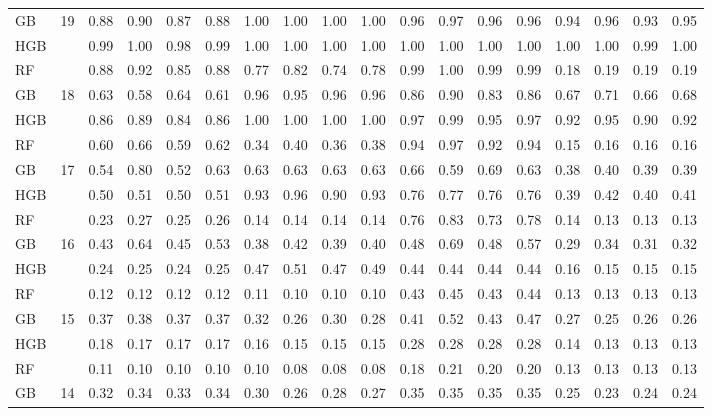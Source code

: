 \documentclass{IEEEtran}
\begin{document}
\begin{table}[th]
\begin{adjustbox}{width=\textwidth}
\begin{tabular}{| l | l | rrrr | rrrr | rrrr | rrrr |}
GB & \multirow{3}{*}{19} & 0.88 & 0.90 & 0.87 & 0.88 & 1.00 & 1.00 & 1.00 & 1.00 & 0.96 & 0.97 & 0.96 & 0.96 & 0.94 & 0.96 & 0.93 & 0.95 \\
HGB &   & 0.99 & 1.00 & 0.98 & 0.99 & 1.00 & 1.00 & 1.00 & 1.00 & 1.00 & 1.00 & 1.00 & 1.00 & 1.00 & 1.00 & 0.99 & 1.00 \\
RF &   & 0.88 & 0.92 & 0.85 & 0.88 & 0.77 & 0.82 & 0.74 & 0.78 & 0.99 & 1.00 & 0.99 & 0.99 & 0.18 & 0.19 & 0.19 & 0.19 \\ \hline
GB & \multirow{3}{*}{18} & 0.63 & 0.58 & 0.64 & 0.61 & 0.96 & 0.95 & 0.96 & 0.96 & 0.86 & 0.90 & 0.83 & 0.86 & 0.67 & 0.71 & 0.66 & 0.68 \\
HGB &   & 0.86 & 0.89 & 0.84 & 0.86 & 1.00 & 1.00 & 1.00 & 1.00 & 0.97 & 0.99 & 0.95 & 0.97 & 0.92 & 0.95 & 0.90 & 0.92 \\
RF &   & 0.60 & 0.66 & 0.59 & 0.62 & 0.34 & 0.40 & 0.36 & 0.38 & 0.94 & 0.97 & 0.92 & 0.94 & 0.15 & 0.16 & 0.16 & 0.16 \\ \hline
GB & \multirow{3}{*}{17} & 0.54 & 0.80 & 0.52 & 0.63 & 0.63 & 0.63 & 0.63 & 0.63 & 0.66 & 0.59 & 0.69 & 0.63 & 0.38 & 0.40 & 0.39 & 0.39 \\
HGB &   & 0.50 & 0.51 & 0.50 & 0.51 & 0.93 & 0.96 & 0.90 & 0.93 & 0.76 & 0.77 & 0.76 & 0.76 & 0.39 & 0.42 & 0.40 & 0.41 \\
RF &   & 0.23 & 0.27 & 0.25 & 0.26 & 0.14 & 0.14 & 0.14 & 0.14 & 0.76 & 0.83 & 0.73 & 0.78 & 0.14 & 0.13 & 0.13 & 0.13 \\ \hline
GB & \multirow{3}{*}{16} & 0.43 & 0.64 & 0.45 & 0.53 & 0.38 & 0.42 & 0.39 & 0.40 & 0.48 & 0.69 & 0.48 & 0.57 & 0.29 & 0.34 & 0.31 & 0.32 \\
HGB &   & 0.24 & 0.25 & 0.24 & 0.25 & 0.47 & 0.51 & 0.47 & 0.49 & 0.44 & 0.44 & 0.44 & 0.44 & 0.16 & 0.15 & 0.15 & 0.15 \\
RF &   & 0.12 & 0.12 & 0.12 & 0.12 & 0.11 & 0.10 & 0.10 & 0.10 & 0.43 & 0.45 & 0.43 & 0.44 & 0.13 & 0.13 & 0.13 & 0.13 \\ \hline
GB & \multirow{3}{*}{15} & 0.37 & 0.38 & 0.37 & 0.37 & 0.32 & 0.26 & 0.30 & 0.28 & 0.41 & 0.52 & 0.43 & 0.47 & 0.27 & 0.25 & 0.26 & 0.26 \\
HGB &   & 0.18 & 0.17 & 0.17 & 0.17 & 0.16 & 0.15 & 0.15 & 0.15 & 0.28 & 0.28 & 0.28 & 0.28 & 0.14 & 0.13 & 0.13 & 0.13 \\
RF &   & 0.11 & 0.10 & 0.10 & 0.10 & 0.10 & 0.08 & 0.08 & 0.08 & 0.18 & 0.21 & 0.20 & 0.20 & 0.13 & 0.13 & 0.13 & 0.13 \\ \hline
GB & \multirow{3}{*}{14} & 0.32 & 0.34 & 0.33 & 0.34 & 0.30 & 0.26 & 0.28 & 0.27 & 0.35 & 0.35 & 0.35 & 0.35 & 0.25 & 0.23 & 0.24 & 0.24 \\

\end{tabular}
\end{adjustbox}
\end{table}
\end{document}
